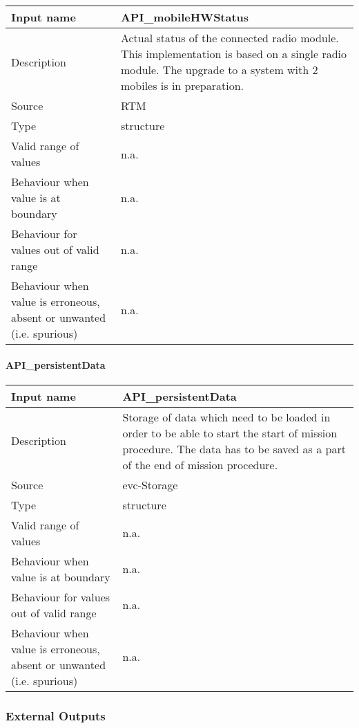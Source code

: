 \begin{longtable}{p{}p{}}
\toprule
Input name				& API\_mobileHWStatus \\
\midrule
Description				& Actual status of the connected radio module. This implementation is based on a single radio module. The upgrade to a system with 2 mobiles is in preparation.\\
\midrule
Source					& RTM \\ 
\midrule
Type					& structure \\
\midrule
Valid range of values	& n.a. \\
\midrule
Behaviour when value is at boundary	& n.a. \\
\midrule
Behaviour for values out of valid range	& n.a. \\
\midrule
Behaviour when value is erroneous, absent or unwanted (i.e. spurious) & n.a. \\
\bottomrule
\end{longtable}

\paragraph{API\_persistentData}

\begin{longtable}{p{}p{}}
\toprule
Input name				& API\_persistentData \\
\midrule
Description				& Storage of data which need to be loaded in order to be able to start the start of mission procedure. The data has to be saved as a part of the end of mission procedure. \\
\midrule
Source					& evc-Storage \\ 
\midrule
Type					& structure \\
\midrule
Valid range of values	& n.a. \\
\midrule
Behaviour when value is at boundary	& n.a. \\
\midrule
Behaviour for values out of valid range	& n.a. \\
\midrule
Behaviour when value is erroneous, absent or unwanted (i.e. spurious) &n.a. \\
\bottomrule
\end{longtable}



\subsubsection{External Outputs}


